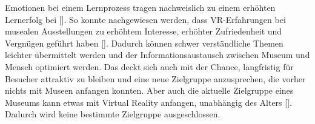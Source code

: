 \documentclass[a4paper,12pt,oneside]{article}
\begin{document}
        Emotionen bei einem Lernprozess tragen nachweislich zu einem erhöhten Lernerfolg
        bei [\cite[29]{Heidsiek2019}]. So konnte nachgewiesen werden, dass VR-Erfahrungen
        bei musealen Ausstellungen zu erhöhtem Interesse, erhöhter Zufriedenheit und 
        Vergnügen geführt haben [\cite[69-72]{Heidsiek2019}]. Dadurch können schwer
        verständliche Themen leichter übermittelt werden und der Informationsaustausch
        zwischen Museum und Mensch optimiert werden. Das deckt sich auch mit der Chance,
        langfristig für Besucher attraktiv zu bleiben und eine neue Zielgruppe anzusprechen,
        die vorher nichts mit Museen anfangen konnten.
        Aber auch die aktuelle Zielgruppe eines Museums kann etwas mit Virtual Reality
        anfangen, unabhängig des Alters [\cite[75]{Heidsiek2019}]. Dadurch wird keine 
        bestimmte Zielgruppe ausgeschlossen.
\end{document}
